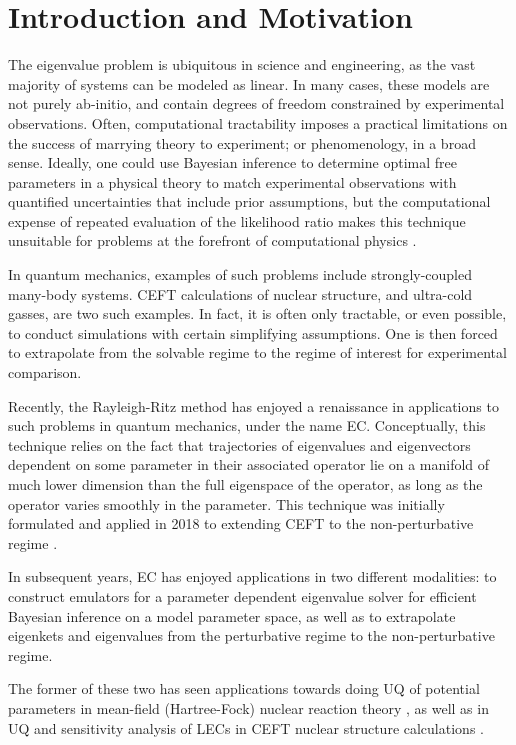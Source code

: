 \documentclass[%
 reprint,
 amsmath,amssymb,
 aps,
]{revtex4-2}
\begin{document}
\section{\label{sec:mot}Introduction and Motivation}
The eigenvalue problem is ubiquitous in science and engineering, as the vast majority of systems can be modeled as linear. In many cases, these models are not purely ab-initio, and contain degrees of freedom constrained by experimental observations. Often, computational tractability imposes a practical limitations on the success of marrying theory to experiment; or phenomenology, in a broad sense.
Ideally, one could use Bayesian inference to determine optimal free parameters in a physical theory to match experimental observations with quantified uncertainties that include prior assumptions, but the computational expense of repeated evaluation of the likelihood ratio makes this technique unsuitable for problems at the forefront of computational physics \cite{king2019direct,box2011bayesian}. 

In quantum mechanics, examples of such problems include strongly-coupled many-body
systems. \ac{CEFT} calculations of nuclear structure, and ultra-cold gasses, are two such examples. In fact, it is often only tractable, or even possible, to conduct simulations with certain simplifying assumptions. One is then forced to extrapolate from the solvable regime to the regime of interest for experimental comparison. 

Recently, the Rayleigh-Ritz method \cite{jia2001analysis,knyazev1997new,jia1999convergence,saad2000introduction} has enjoyed a renaissance in applications to such problems in quantum mechanics, under the name
\ac{EC}. Conceptually, this technique relies on the fact that trajectories of eigenvalues and eigenvectors dependent on some parameter in their associated operator lie on a manifold of much lower dimension than the full eigenspace of the operator, as long as the operator varies smoothly in the parameter. This technique was initially formulated and applied in 2018 to extending \ac{CEFT} to the non-perturbative regime \cite{frame2018eigenvector,frame2019ab}.

In subsequent years, \ac{EC} has enjoyed applications in two different modalities: to construct emulators for a parameter dependent eigenvalue solver for efficient Bayesian inference on a model parameter space, as well as to extrapolate eigenkets and eigenvalues from the perturbative regime to the non-perturbative regime. 

The former of these two has seen applications towards doing \ac{UQ} of potential parameters in mean-field (Hartree-Fock) nuclear reaction theory \cite{drischler2021toward,furnstahl2020efficient,konig2020eigenvector}, as well as in \ac{UQ} and sensitivity analysis of \ac{LEC}s in \ac{CEFT} nuclear structure calculations \cite{ekstrom2019global}.
\end{document}

